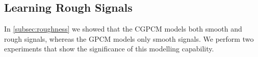 \documentclass{article}
\begin{document}

\subsection{Learning Rough Signals}
In \cref{subsec:roughness} we showed that the CGPCM models both smooth and rough signals, whereas the GPCM models only smooth signals. We perform two experiments that show the significance of this modelling capability.
\end{document}
